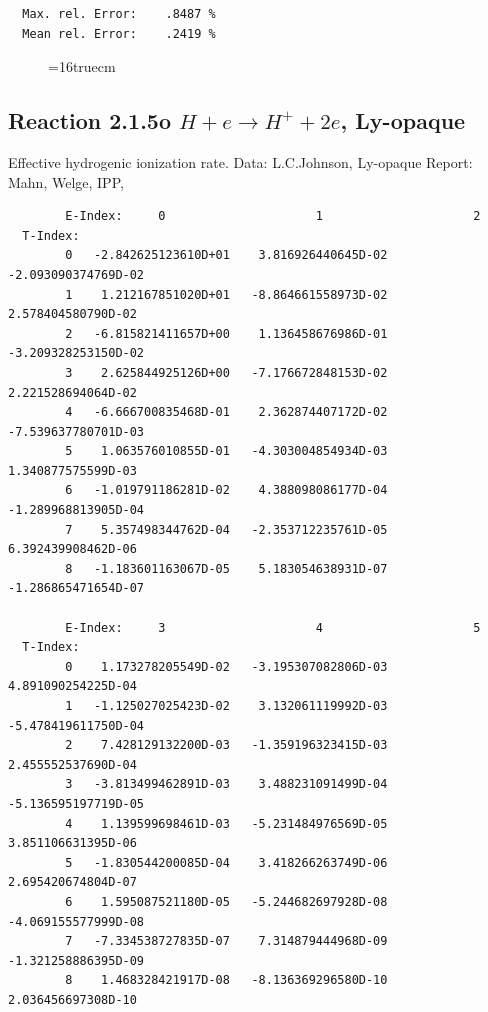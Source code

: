 \documentclass[12pt,dvipdfmx]{article}
\begin{document}
\begin{small}
\begin{verbatim}
  Max. rel. Error:    .8487 %
  Mean rel. Error:    .2419 %
\end{verbatim}\end{small}
\begin{figure} \label{2.1.5}
\epsfxsize=16truecm
\end{figure}
\newpage

\subsection{
Reaction 2.1.5o  $H + e \rightarrow H^+ + 2e $, Ly-opaque}


   Effective hydrogenic ionization rate. Data: L.C.Johnson, Ly-opaque
   Report: Mahn, Welge, IPP, \cite{kn:Mahn}

\begin{small}\begin{verbatim}
        E-Index:     0                     1                     2
  T-Index:
        0   -2.842625123610D+01    3.816926440645D-02   -2.093090374769D-02
        1    1.212167851020D+01   -8.864661558973D-02    2.578404580790D-02
        2   -6.815821411657D+00    1.136458676986D-01   -3.209328253150D-02
        3    2.625844925126D+00   -7.176672848153D-02    2.221528694064D-02
        4   -6.666700835468D-01    2.362874407172D-02   -7.539637780701D-03
        5    1.063576010855D-01   -4.303004854934D-03    1.340877575599D-03
        6   -1.019791186281D-02    4.388098086177D-04   -1.289968813905D-04
        7    5.357498344762D-04   -2.353712235761D-05    6.392439908462D-06
        8   -1.183601163067D-05    5.183054638931D-07   -1.286865471654D-07

        E-Index:     3                     4                     5
  T-Index:
        0    1.173278205549D-02   -3.195307082806D-03    4.891090254225D-04
        1   -1.125027025423D-02    3.132061119992D-03   -5.478419611750D-04
        2    7.428129132200D-03   -1.359196323415D-03    2.455552537690D-04
        3   -3.813499462891D-03    3.488231091499D-04   -5.136595197719D-05
        4    1.139599698461D-03   -5.231484976569D-05    3.851106631395D-06
        5   -1.830544200085D-04    3.418266263749D-06    2.695420674804D-07
        6    1.595087521180D-05   -5.244682697928D-08   -4.069155577999D-08
        7   -7.334538727835D-07    7.314879444968D-09   -1.321258886395D-09
        8    1.468328421917D-08   -8.136369296580D-10    2.036456697308D-10


\end{verbatim}
\end{small}
\end{document}
